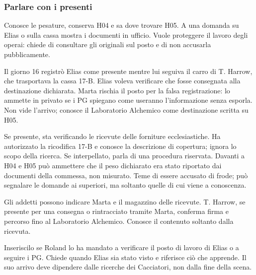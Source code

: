 \documentclass[11pt,a4paper]{article}
\begin{document}
\subsubsection{Parlare con i presenti}
\begin{description}[leftmargin=5mm,style=nextline]
\item[Marta Ghal.]
Conosce le pesature, conserva H04 e sa dove trovare H05. A una domanda su Elias o sulla cassa mostra i documenti in ufficio. Vuole proteggere il lavoro degli operai: chiede di consultare gli originali sul posto e di non accusarla pubblicamente.

Il giorno 16 registrò Elias come presente mentre lui seguiva il carro di T. Harrow, che trasportava la cassa 17-B. Elias voleva verificare che fosse consegnata alla destinazione dichiarata. Marta rischia il posto per la falsa registrazione: lo ammette in privato se i PG spiegano come useranno l'informazione senza esporla. Non vide l'arrivo; conosce il Laboratorio Alchemico come destinazione scritta su H05.
\item[Il contabile della Chiesa.]
Se presente, sta verificando le ricevute delle forniture ecclesiastiche. Ha autorizzato la ricodifica 17-B e conosce la descrizione di copertura; ignora lo scopo della ricerca. Se interpellato, parla di una procedura riservata. Davanti a H04 e H05 può ammettere che il peso dichiarato era stato riportato dai documenti della commessa, non misurato. Teme di essere accusato di frode; può segnalare le domande ai superiori, ma soltanto quelle di cui viene a conoscenza.
\item[Operai e vetturale.]
Gli addetti possono indicare Marta e il magazzino delle ricevute. T. Harrow, se presente per una consegna o rintracciato tramite Marta, conferma firma e percorso fino al Laboratorio Alchemico. Conosce il contenuto soltanto dalla ricevuta.
\item[Nox, presenza eventuale.]
Inseriscilo se Roland lo ha mandato a verificare il posto di lavoro di Elias o a seguire i PG. Chiede quando Elias sia stato visto e riferisce ciò che apprende. Il suo arrivo deve dipendere dalle ricerche dei Cacciatori, non dalla fine della scena.
\end{description}
\end{document}
